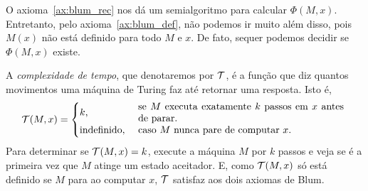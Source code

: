 O axioma~\ref{ax:blum_rec}
nos dá um semialgoritmo para calcular $\Phi(M, x)$.
Entretanto, pelo axioma~\ref{ax:blum_def},
não podemos ir muito além disso,
pois $M(x)$ não está definido para todo $M$ e $x$.
De fato, sequer podemos decidir se $\Phi(M, x)$ existe.

\begin{example}
    \label{ex:time_complexity}
    A \emph{complexidade de tempo},
    que denotaremos por ${\mathcal{T}}$,
    é a função que diz quantos movimentos
    uma máquina de Turing faz até retornar uma resposta.
    Isto é,
    \begin{equation*}
        \PhiDT(M, x) = \begin{cases}
            k, & \text{
                \parbox{0.6\textwidth}{
                    se $M$ executa exatamente $k$ passos em $x$ antes de parar.
                }
            } \\
            \text{indefinido}, & \text{
                \parbox{0.6\textwidth}{
                    caso $M$ nunca pare de computar $x$.
                }
            }
        \end{cases}
    \end{equation*}
    Para determinar se ${\mathcal{T}}(M, x) = k$,
    execute a máquina $M$ por $k$ passos
    e veja se é a primeira vez que
    $M$ atinge um estado aceitador.
    E, como ${\mathcal{T}}(M, x)$ só está definido se $M$ para ao computar $x$,
    ${\mathcal{T}}$ satisfaz aos dois axiomas de Blum.
\end{example}


